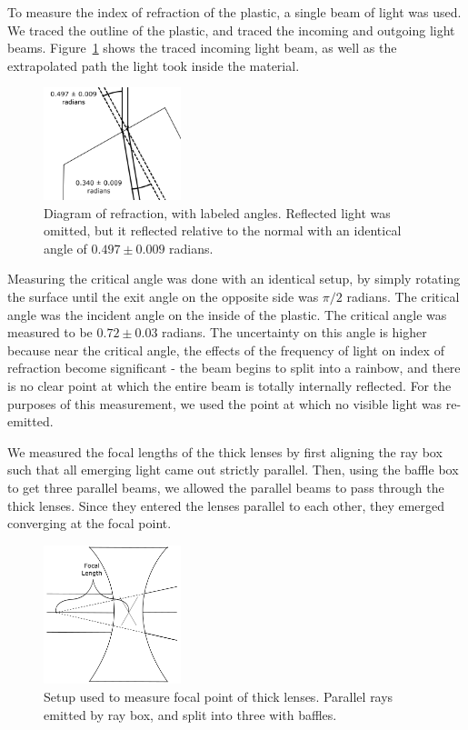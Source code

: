 \documentclass[journal]{IEEEtran}
\begin{document}
To measure the index of refraction of the plastic, a single beam of light was
used. We traced the outline of the plastic, and traced the incoming and
outgoing light beams. Figure~\ref{fig:refraction} shows the traced incoming
light beam, as well as the extrapolated path the light took inside the
material. 

\begin{figure}[ht!]
\centering
\includegraphics[width=40mm]{refract.png}
\caption{Diagram of refraction, with labeled angles. Reflected light was
omitted, but it reflected relative to the normal with an identical angle of
$0.497 \pm 0.009$ radians.}
\label{fig:refraction}
\end{figure}

Measuring the critical angle was done with an identical setup, by simply
rotating the surface until the exit angle on the opposite side was $\pi / 2$
radians. The critical angle was the incident angle on the inside of the
plastic. The critical angle was measured to be $0.72 \pm 0.03$ radians. The
uncertainty on this angle is higher because near the critical angle, the
effects of the frequency of light on index of refraction become significant -
the beam begins to split into a rainbow, and there is no clear point at which
the entire beam is totally internally reflected. For the purposes of this
measurement, we used the point at which no visible light was re-emitted.

We measured the focal lengths of the thick lenses by first aligning the ray box
such that all emerging light came out strictly parallel. Then, using the baffle
box to get three parallel beams, we allowed the parallel beams to pass through
the thick lenses. Since they entered the lenses parallel to each other, they
emerged converging at the focal point.

\begin{figure}[ht!]
\centering
\includegraphics[width=40mm]{focallen.png}
\caption{Setup used to measure focal point of thick lenses. Parallel rays
emitted by ray box, and split into three with baffles.}
\label{fig:focallen}
\end{figure}
\end{document}
